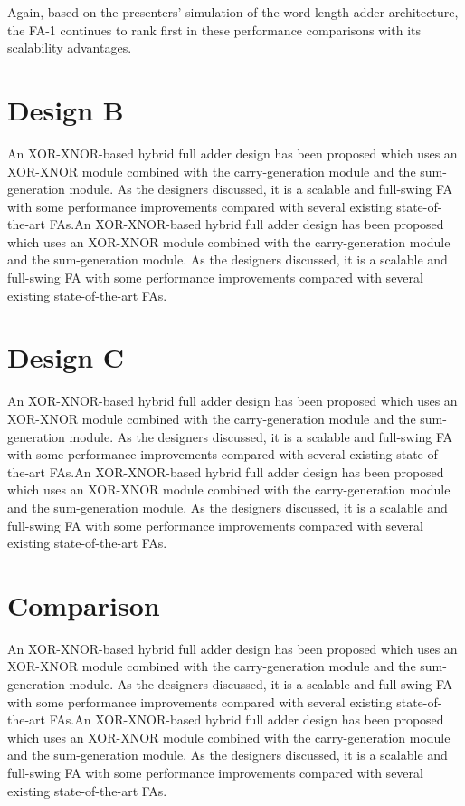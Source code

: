 \documentclass[conference]{IEEEtran}
\begin{document}
Again, based on the presenters' simulation of the word-length adder architecture\cite{20212210429416}, the FA-1 continues to rank first in these performance comparisons with its scalability advantages.

\section{Design B}

An XOR-XNOR-based hybrid full adder design has been proposed\cite{20212210429416}
which uses an XOR-XNOR module combined with the carry-generation module and the sum-generation module.
As the designers discussed, it is a scalable and full-swing FA
with some performance improvements compared with several existing state-of-the-art FAs.An XOR-XNOR-based hybrid full adder design has been proposed\cite{20212210429416}
which uses an XOR-XNOR module combined with the carry-generation module and the sum-generation module.
As the designers discussed, it is a scalable and full-swing FA
with some performance improvements compared with several existing state-of-the-art FAs.

\section{Design C}

An XOR-XNOR-based hybrid full adder design has been proposed\cite{20212210429416}
which uses an XOR-XNOR module combined with the carry-generation module and the sum-generation module.
As the designers discussed, it is a scalable and full-swing FA
with some performance improvements compared with several existing state-of-the-art FAs.An XOR-XNOR-based hybrid full adder design has been proposed\cite{20212210429416}
which uses an XOR-XNOR module combined with the carry-generation module and the sum-generation module.
As the designers discussed, it is a scalable and full-swing FA
with some performance improvements compared with several existing state-of-the-art FAs.

\section{Comparison}

An XOR-XNOR-based hybrid full adder design has been proposed\cite{20212210429416}
which uses an XOR-XNOR module combined with the carry-generation module and the sum-generation module.
As the designers discussed, it is a scalable and full-swing FA
with some performance improvements compared with several existing state-of-the-art FAs.An XOR-XNOR-based hybrid full adder design has been proposed\cite{20212210429416}
which uses an XOR-XNOR module combined with the carry-generation module and the sum-generation module.
As the designers discussed, it is a scalable and full-swing FA
with some performance improvements compared with several existing state-of-the-art FAs.
\end{document}
